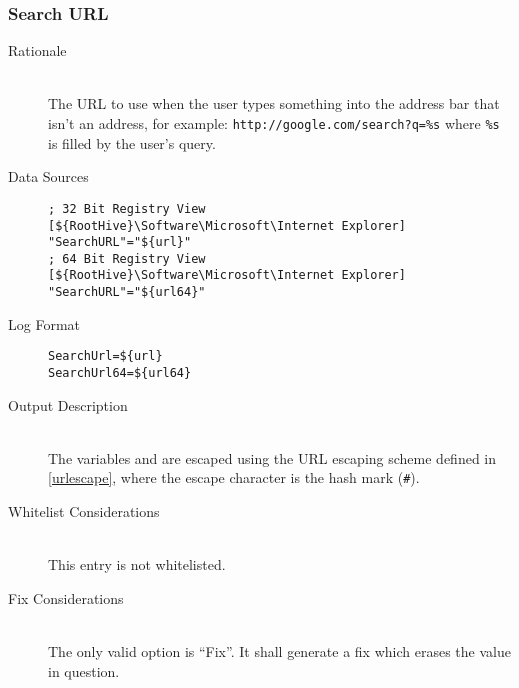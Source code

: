 \subsubsection{Search URL}
\begin{description}
\item[Rationale] \hfill \\
The URL to use when the user types something into the address bar that isn't
an address, for example: \verb|http://google.com/search?q=%s| where \verb|%s|
is filled by the user's query.

\item[Data Sources] \hfill
\vspace{-\baselineskip}
\begin{verbatim}
; 32 Bit Registry View
[${RootHive}\Software\Microsoft\Internet Explorer]
"SearchURL"="${url}"
; 64 Bit Registry View
[${RootHive}\Software\Microsoft\Internet Explorer]
"SearchURL"="${url64}"
\end{verbatim}
\item[Log Format] \hfill
\vspace{-\baselineskip}
\begin{verbatim}
SearchUrl=${url}
SearchUrl64=${url64}
\end{verbatim}
\item[Output Description] \hfill \\
The variables  and  are escaped using the URL escaping
scheme defined in \ref{urlescape}, where the escape character is the hash mark
(\verb|#|).
\item[Whitelist Considerations] \hfill \\
This entry is not whitelisted.
\item[Fix Considerations] \hfill \\
The only valid option is ``Fix''. It shall generate a fix which erases the value
in question.
\end{description}

